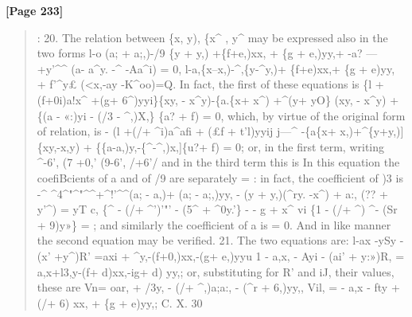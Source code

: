 \documentclass[11pt,a4paper]{book}
\begin{document}
\textbf{[Page 233]}\\[0.2cm]
\begin{quote}
:
20. The relation between \{x, y), \{x\textasciicircum{} , y\textasciicircum{} may be expressed also in the two forms
l-o (a; + a;,)-/9 \{y + y,) +\{f+e,)xx, + \{g + e,)yy,+
-a? --- +y'\textasciicircum{}\textasciicircum{}
(a- a\textasciicircum{}y. -\textasciicircum{} -Aa\textasciicircum{}i) = 0,
l-a,\{x--x,)-\textasciicircum{},\{y-\textasciicircum{}y,)+ \{f+e)xx,+ \{g + e)yy, + f'\textasciicircum{}y£ (<x,-ay -K\textasciicircum{}oo)=Q.
In fact, the first of these equations is
\{l + (f+0i)a!x\textasciicircum{} +(g+ 6\textasciicircum{})yyi\}\{xy, - x\textasciicircum{}y)-\{a.\{x+ x\textasciicircum{}) +\textasciicircum{}(y+ yO\} (xy, - x\textasciicircum{}y)
+ \{(a - «:)yi - (/3 - \textasciicircum{},)X,\} \{a? + f) = 0,
which, by virtue of the original form of relation, is
- (l +(/+ \textasciicircum{}i)a\textasciicircum{}afi + (£f + t'l)yyij j---\textasciicircum{}
-\{a\{x+ x,)+\textasciicircum{}\{y+y,)]\{xy,-x,y) + \{\{a-a,)y,-\{\textasciicircum{}-\textasciicircum{},)x,]\{u?+ f) = 0;
or, in the first term, writing
\textasciicircum{}-6', (7 +0,' (9-6', /+6'/
and in the third term
this is
In this equation the coefiBcients of a and of /9 are separately = : in fact, the coefficient
of )3 is
-\textasciicircum{}
\textasciicircum{}4\textasciicircum{}"\textasciicircum{}"\textasciicircum{}\textasciicircum{}+\textasciicircum{}!'\textasciicircum{}\textasciicircum{}(a; - a,)+ (a; - a;,)yy, - (y + y,)(\textasciicircum{}ry. -x\textasciicircum{}) + a:, (?? + y'\textasciicircum{})
= yT c, \{\textasciicircum{} - (/+ \textasciicircum{}')'"' - (5\textasciicircum{} + \textasciicircum{}0y.'\} - - g + x\textasciicircum{} vi \{1 - (/+ \textasciicircum{}) \textasciicircum{}- (Sr + 9)y»\} = ;
and similarly the coefficient of a is = 0.
And in like manner the second equation may be verified.
21. The two equations are:
l-ax -ySy -(x' +y\textasciicircum{})R' =axi + \textasciicircum{}y,-(f+0,)xx,-(g+ e,)yyu
1 - a,x, - Ayi - (ai' + y:»)R, = a,x+l3,y-(f+ d)xx,-ig+ d) yy,;
or, substituting for R' and iJ, their values, these are
Vn= oar, + /3y, - (/+ \textasciicircum{},)a;a:, - (\textasciicircum{}r + 6,)yy,, Vil, = - a,x - fty +(/+ 6) xx, + \{g + e)yy,;
C. X. 30
\end{quote}
\end{document}
